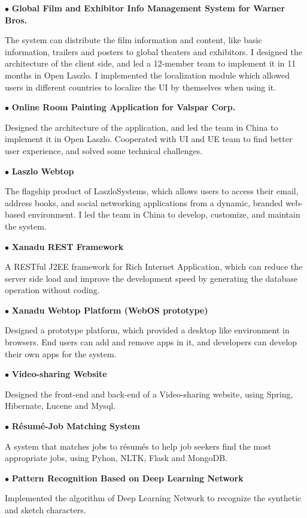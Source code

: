 \documentclass[10pt]{article}
\begin{document}
$\bullet$ \textbf{ Global Film and Exhibitor Info Management System for Warner Bros.}

The system can distribute the film information and content, like basic information, trailers and posters to global theaters and exhibitors. I designed the architecture of the client side, and led a 12-member team to implement it in 11 months in Open Laszlo. I implemented the localization module which allowed users in different countries to localize the UI by themselves when using it.

$\bullet$ \textbf{ Online Room Painting Application for Valspar Corp. }

Designed the architecture of the application, and led the team in China to implement it in Open Laszlo. Cooperated with UI and UE team to find better user experience, and solved some technical challenges.

$\bullet$ \textbf{ Laszlo Webtop }

The flagship product of LaszloSystems, which allows users to access their email, address books, and social networking applications from a dynamic, branded web-based environment. I led the team in China to develop, customize, and maintain the system.

$\bullet$ \textbf{ Xanadu REST Framework}

A RESTful J2EE framework for Rich Internet Application, which can  reduce the server side load and improve the development speed by generating the database operation without coding.

$\bullet$ \textbf{ Xanadu Webtop Platform (WebOS prototype)}

Designed a prototype platform, which provided a desktop like environment in browsers. End users can add and remove apps in it, and developers can develop their own apps for the system.


$\bullet$ \textbf{ Video-sharing Website }

Designed the front-end and back-end of a Video-sharing website, using Spring, Hibernate, Lucene and Mysql.

$\bullet$ \textbf{ R\'esum\'e-Job Matching System  }

A system that matches jobs to r\'esum\'es to help job seekers find the most appropriate jobs, using Pyhon, NLTK, Flask and MongoDB.

$\bullet$ \textbf{ Pattern Recognition Based on Deep Learning Network }

Implemented the algorithm of Deep Learning Network to recognize the synthetic and sketch characters.

\end{document}
